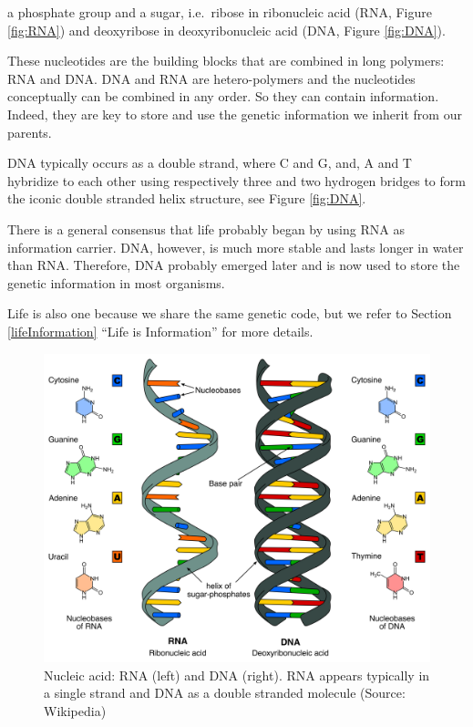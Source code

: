 \documentclass[
  11pt,
]{book}
\begin{document}
a phosphate group and a sugar, i.e.~ribose in ribonucleic acid (RNA, Figure \ref{fig:RNA}) and deoxyribose in deoxyribonucleic acid (DNA, Figure \ref{fig:DNA}).

These nucleotides are the building blocks that are combined in long polymers: RNA and DNA.
DNA and RNA are hetero-polymers and the nucleotides conceptually can be combined in any order.
So they can contain information.
Indeed, they are key to store and use the genetic information we inherit from our parents.

DNA typically occurs as a double strand, where C and G, and, A and T hybridize to each other using respectively three and two hydrogen bridges to form the iconic double stranded helix structure, see Figure \ref{fig:DNA}.

There is a general consensus that life probably began by using RNA as information carrier.
DNA, however, is much more stable and lasts longer in water than RNA. Therefore, DNA probably emerged later and is now used to store the genetic information in most organisms.

Life is also one because we share the same genetic code, but we refer to Section \ref{lifeInformation} ``Life is Information'' for more details.

\begin{figure}

{\centering \includegraphics[width=0.5\linewidth]{./figs/Difference_DNA_RNA-EN} 

}

\caption{Nucleic acid: RNA (left) and DNA (right). RNA appears typically in a single strand and DNA as a double stranded molecule (Source: Wikipedia)}\label{fig:RNAvsDNA}
\end{figure}
\end{document}
